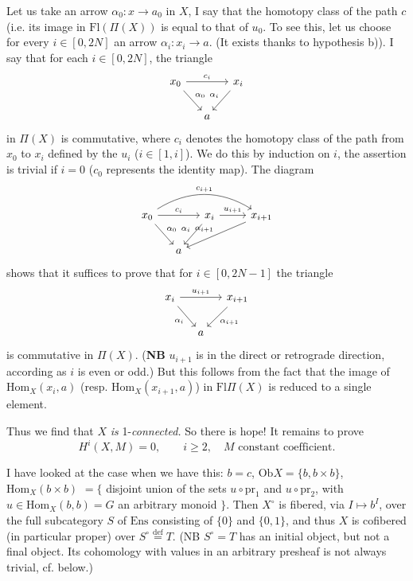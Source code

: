 \documentclass[11pt]{article}
\newcommand{\printedpage}[1]{\marginpar{\footnotesize p.~#1}}
\newcommand{\msp}[1]{\marginpar{\footnotesize [#1]}}
\newcommand{\Hom}{\mathrm{Hom}}
\newcommand{\Fl}{\mathrm{Fl}}
\newcommand{\Ob}{\mathrm{Ob}}
\newcommand{\Ens}{\mathrm{Ens}}
\newcommand{\pr}{\mathrm{pr}}
\newcommand{\deq}{\mathrel{\overset{\text{def}}{=}}}
\begin{document}
Let us take an arrow $\alpha_0 : x\longrightarrow a_0$ in $X$, I say that the %
\msp{page 2}
homotopy class of the path $c$ (i.e. its image in $\Fl(\Pi(X))$ is equal to that of $u_0$. %
To see this, let us choose for every $i\in[0,2N]$ an arrow $\alpha_i : x_i\longrightarrow a$. (It exists thanks to hypothesis b)). I say that for each $i\in[0,2N]$, the triangle
\printedpage{2}
\[
\begin{tikzcd}[column sep=small]
x_0 \arrow[rr, "c_i"] \arrow[dr, "\alpha_0"] & & x_i \arrow[dl, "\alpha_i"'] \\
& a &
\end{tikzcd}
\]
in $\Pi(X)$ is commutative, where $c_i$ denotes the homotopy class of the path from $x_0$ to $x_i$ defined by the $u_i$ ($i\in[1,i]$). We do this by induction on $i$, the assertion is trivial if $i = 0$ ($c_0$ represents the identity map). The diagram %
\[
\begin{tikzcd}[column sep=small]
x_0 \arrow[rr, "c_i"] \arrow[dr, "\alpha_0"] \arrow[rrrr, bend left=32, "c_{i+1}"] & & x_i \arrow[dl, "\alpha_i"'] \arrow[rr, "u_{i+1}"] & & x_{i+1} \arrow[dlll, "\alpha_{i+1}"'] \\ %
& a & & &
\end{tikzcd}
\]
shows that it suffices to prove that for $i\in[0,2N-1]$ the triangle
\[
\begin{tikzcd}[column sep=small]
x_i \arrow[rr, "u_{i+1}"] \arrow[dr, "\alpha_i"'] & & x_{i+1} \arrow[dl, "\alpha_{i+1}"] \\
& a &
\end{tikzcd}
\]
is commutative in $\Pi(X)$. (\textbf{NB} $u_{i+1}$ is in the direct or retrograde direction, according as %
$i$ is even or odd.) But this follows from the fact that the image of $\Hom_X(x_i,a)$ (resp. $\Hom_X(x_{i+1},a)$) %
\msp{page 3}
in $\Fl\Pi(X)$ is reduced to a single element.

Thus we find that $X$ \textit{is} 1-\textit{connected.} So there is hope! It remains to prove
\[
H^i(X,M) = 0, \qquad i\geq 2, \quad M \text{ constant coefficient.}
\]

I have looked at the case when we have this: $b = c$, $\Ob X = \{b, b\times b\}$, $\Hom_X(b\times b)$ $= \{$ disjoint union of the sets $u\circ\pr_1$ and $u\circ\pr_2$, with $u\in\Hom_X(b,b) = G$ an arbitrary monoid $\}$. Then $X^\circ$ is fibered, via $I\longmapsto b^I$, over the full subcategory $S$ of $\Ens$ consisting of $\{0\}$ and $\{0,1\}$, and thus $X$ is cofibered (in particular proper) over $S^\circ \deq T$. (NB $S^\circ = T$ has an initial object, but not a final object. Its cohomology with values in an arbitrary presheaf is not always trivial, cf. below.)
\end{document}
